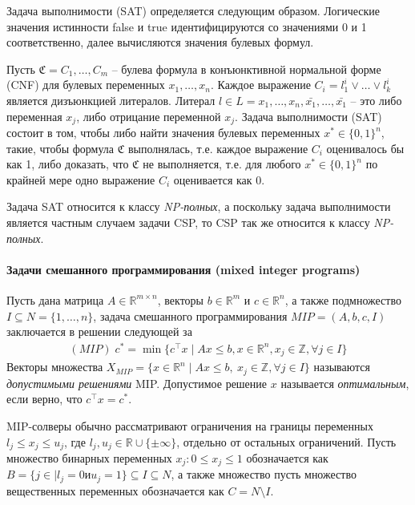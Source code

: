 \documentclass[%
	11pt,
	a4paper,
	utf8,
		]{article}
\begin{document}
Задача выполнимости (SAT) определяется следующим образом. Логические значения истинности false и true идентифицируются со значениями 0 и 1 соответственно, далее вычисляются значения булевых формул.

\begin{definition}
	Пусть $\mathfrak{C}=C_1,\ldots,C_m$ -- булева формула в конъюнктивной нормальной форме (CNF) для булевых переменных $x_1,\ldots, x_n$. Каждое выражение $C_i=l^i_1\vee\ldots\vee l^i_k$ является дизъюнкцией литералов. Литерал $l\in L={x_1,\ldots,x_n,\bar{x_1},\ldots,\bar{x_1}}$ -- это либо переменная $x_j$, либо отрицание переменной $x_j$. Задача  выполнимости (SAT) состоит в том, чтобы либо найти значения булевых переменных $x^{*}\in\{0, 1\}^n$, такие, чтобы формула $\mathfrak{C}$ выполнялась, т.е. каждое выражение $C_i$ оценивалось бы как 1, либо доказать, что $\mathfrak{C}$ не выполняется, т.е. для любого $x^{*}\in\{0, 1\}^n$ по крайней мере одно выражение $C_i$ оценивается как 0.
\end{definition}

Задача SAT относится к классу \emph{NP-полных}, а поскольку задача выполнимости является частным случаем задачи CSP, то CSP так же относится к классу \emph{NP-полных}.

\paragraph{Задачи смешанного программирования (mixed integer programs)}

\begin{definition}
	Пусть дана матрица $A\in \mathbb{R}^{m\times n}$, векторы $b\in \mathbb{R}^{m}$ и $c\in \mathbb{R}^{n}$, а также подмножество $I\subseteq N=\{1,\ldots,n\}$, задача смешанного программирования $MIP=(A,b,c,I)$ заключается в решении следующей за
	\begin{align*}
		(MIP)\;c^{*}=\min\{c^{\intercal}x\mid Ax\le b, x\in\mathbb{R}^{n}, x_j\in \mathbb{Z},\forall j\in I\}
	\end{align*}
	Векторы множества $X_{MIP}=\{x\in\mathbb{R}^{n}\mid Ax\le b,\: x_j\in \mathbb{Z},\forall j\in I\}$ называются \textit{допустимыми решениями} MIP. Допустимое решение $x$ называется \textit{оптимальным}, если верно, что $c^{\intercal}x=c^{*}$.
\end{definition}

MIP-солверы обычно рассматривают ограничения на границы переменных $l_j\le x_j\le u_j$, где $l_j, u_j\in \mathbb{R}\cup\{\pm\infty\}$, отдельно от остальных ограничений. Пусть множество бинарных переменных $x_j:0\le x_j\le 1$ обозначается как $B=\{j\in\mid l_j = 0 и u_j = 1\}\subseteq I\subseteq N$, а также множество пусть множество вещественных переменных обозначается как $C=N\setminus I$.
\end{document}
